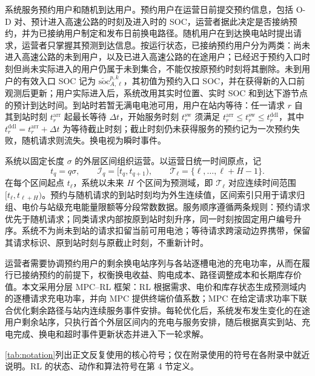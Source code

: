 \documentclass[12pt,a4paper,UTF8]{ctexart}
\begin{document}
系统服务预约用户和随机到达用户。预约用户在运营日前提交预约信息，包括 O-D 对、预计进入高速公路的时刻及进入时的 SOC，运营者据此决定是否接纳预约，并为已接纳用户制定和发布日前换电路径。随机用户在到达换电站时提出请求，运营者只掌握其预测到达信息。按运行状态，已接纳预约用户分为两类：尚未进入高速公路的未到用户，以及已进入高速公路的在途用户；已经迟于预约入口时刻但尚未实际进入的用户仍属于未到集合，不能仅按原预约时刻将其删除。未到用户的有效入口 SOC 记为 $\widetilde{\mathrm{soc}}_{A,\ell}^{p,k}$，其初值为预约入口 SOC，并在获得新的入口前观测后更新；用户实际进入后，系统改用其实时位置、实时 SOC 和到达下游节点的预计到达时间。到站时若暂无满电电池可用，用户在站内等待：任一请求 $r$ 自其到站时刻 $t_r^{\mathrm{arr}}$ 起最长等待 $\Delta t$，开始服务时刻 $t_r^{\mathrm{sw}}$ 须满足 $t_r^{\mathrm{arr}}\le t_r^{\mathrm{sw}}\le t_r^{\mathrm{ddl}}$，其中 $t_r^{\mathrm{ddl}}=t_r^{\mathrm{arr}}+\Delta t$ 为等待截止时刻；截止时刻仍未获得服务的预约记为一次预约失败，随机请求则流失。换电视为瞬时事件。

系统以固定长度 $\sigma$ 的外层区间组织运营。以运营日统一时间原点，记
\[
t_q=q\sigma,
\qquad
\mathcal I_q=[t_q,t_{q+1}),
\qquad
\mathcal T_\ell=\{\ell,\ldots,\ell+H-1\}.
\]
在每个区间起点 $t_\ell$，系统以未来 $H$ 个区间为预测域，即 $\mathcal T_\ell$ 对应连续时间范围 $[t_\ell,t_{\ell+H})$。预约与随机请求的到站时刻均为外生连续值，区间索引只用于请求归组、电价与站级充电能量限额等分段常数数据。服务顺序遵循两条规则：预约请求优先于随机请求；同类请求内部按原到站时刻升序，同一时刻按固定用户编号升序。系统不为尚未到站的请求扣留当前可用电池；等待请求跨滚动边界携带，保留其请求标识、原到站时刻与原截止时刻，不重新计时。

运营者需要协调预约用户的剩余换电站序列与各站逐槽电池的充电功率，从而在履行已接纳预约的前提下，权衡换电收益、购电成本、路径调整成本和长期库存价值。本文采用分层 MPC--RL 框架：RL 根据需求、电价和库存状态生成预测域内的逐槽请求充电功率，并向 MPC 提供终端价值系数；MPC 在给定请求功率下联合优化剩余路径与站内连续服务事件安排。每轮优化后，系统发布发生变化的在途用户剩余站序，只执行首个外层区间内的充电与服务安排，随后根据真实到站、充电完成、换电和超时事件更新状态并进入下一轮求解。

\autoref{tab:notation}列出正文反复使用的核心符号；仅在附录使用的符号在各附录中就近说明。RL 的状态、动作和算法符号在第 4 节定义。
\end{document}
